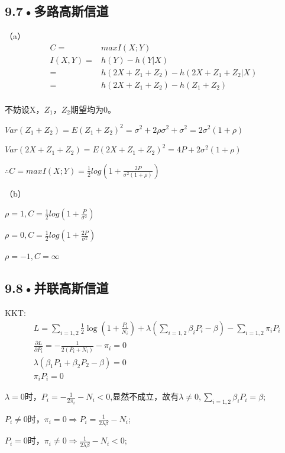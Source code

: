 \documentclass[UTF8]{ctexart}
\begin{document}
\subsection*{9.7•多路高斯信道}
（a）\begin{equation*}
    \begin{split}
        C =& max I(X;Y)\\
        I(X,Y)=& h(Y) - h(Y|X)\\
        =& h(2X+Z_1+Z_2) - h(2X+Z_1+Z_2|X)\\
        =& h(2X+Z_1+Z_2)-h(Z_1+Z_2)\\
    \end{split}
\end{equation*}

不妨设X，$Z_1$，$Z_2$期望均为0。

$ Var(Z_1+Z_2)=E(Z_1+Z_2)^2=\sigma^2+2\rho\sigma^2+\sigma^2 = 2\sigma^2(1+\rho)$

$Var(2X+Z_1+Z_2)=E(2X+Z_1+Z_2)^2=4P + 2\sigma^2(1+\rho)$

$\therefore C = max I(X;Y)=\frac{1}{2}log (1+ \frac{2P}{\sigma^2(1+\rho)})$

（b）

$\rho = 1, C =\frac{1}{2}log (1+ \frac{P}{\sigma^2})$

$\rho = 0, C =\frac{1}{2}log (1+ \frac{2P}{\sigma^2})$

$\rho = -1, C =\infty$

\subsection*{9.8•并联高斯信道}
KKT:
\begin{equation*}
    \begin{split}
        &L = \sum_{i = 1,2}\frac{1}{2}\log (1+\frac{P_i}{N_i})+\lambda (\sum_{i=1,2}\beta_iP_i-\beta)-\sum_{i=1,2}\pi_iP_i\\
        &\frac{\partial L}{\partial P_i}=-\frac{1}{2(P_i+N_i)}-\pi_i=0\\
        &\lambda (\beta_1P_1+\beta_2P_2-\beta)=0\\
        &\pi_iP_i=0
    \end{split}
\end{equation*}

$\lambda = 0$时，$P_i=-\frac{1}{2\pi_i}-N_i<0$,显然不成立，故有$\lambda \neq 0, \sum_{i=1,2}\beta_iP_i=\beta$;

$P_i\neq 0$时，$\pi_i = 0\Rightarrow P_i=\frac{1}{2\lambda\beta}-N_i$;

$P_i= 0$时，$\pi_i \neq 0\Rightarrow \frac{1}{2\lambda\beta}-N_i<0$;
\end{document}
